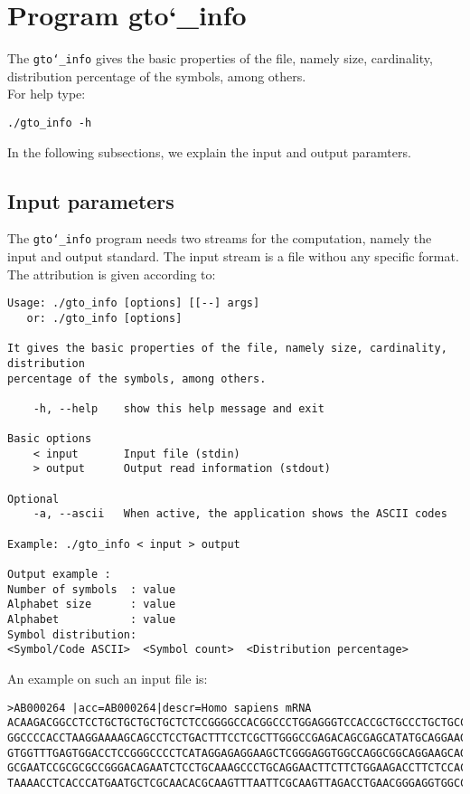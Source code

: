 \section{Program gto\char`_info}
The \texttt{gto\char`_info} gives the basic properties of the file, namely size, cardinality, distribution percentage of the symbols, among others.\\
For help type:
\begin{lstlisting}
./gto_info -h
\end{lstlisting}
In the following subsections, we explain the input and output paramters.

\subsection*{Input parameters}

The \texttt{gto\char`_info} program needs two streams for the computation, namely the input and output standard. The input stream is a file withou any specific format.\\
The attribution is given according to:
\begin{lstlisting}
Usage: ./gto_info [options] [[--] args]
   or: ./gto_info [options]

It gives the basic properties of the file, namely size, cardinality, distribution 
percentage of the symbols, among others.

    -h, --help    show this help message and exit

Basic options
    < input       Input file (stdin)
    > output      Output read information (stdout)

Optional
    -a, --ascii   When active, the application shows the ASCII codes

Example: ./gto_info < input > output

Output example :
Number of symbols  : value
Alphabet size      : value
Alphabet           : value
Symbol distribution:
<Symbol/Code ASCII>  <Symbol count>  <Distribution percentage>
\end{lstlisting}
An example on such an input file is:
\begin{lstlisting}
>AB000264 |acc=AB000264|descr=Homo sapiens mRNA 
ACAAGACGGCCTCCTGCTGCTGCTGCTCTCCGGGGCCACGGCCCTGGAGGGTCCACCGCTGCCCTGCTGCCATTGTCCCC
GGCCCCACCTAAGGAAAAGCAGCCTCCTGACTTTCCTCGCTTGGGCCGAGACAGCGAGCATATGCAGGAAGCGGCAGGAA
GTGGTTTGAGTGGACCTCCGGGCCCCTCATAGGAGAGGAAGCTCGGGAGGTGGCCAGGCGGCAGGAAGCAGGCCAGTGCC
GCGAATCCGCGCGCCGGGACAGAATCTCCTGCAAAGCCCTGCAGGAACTTCTTCTGGAAGACCTTCTCCACCCCCCCAGC
TAAAACCTCACCCATGAATGCTCGCAACACGCAAGTTTAATTCGCAAGTTAGACCTGAACGGGAGGTGGCCACGCAAGTT
\end{lstlisting}

